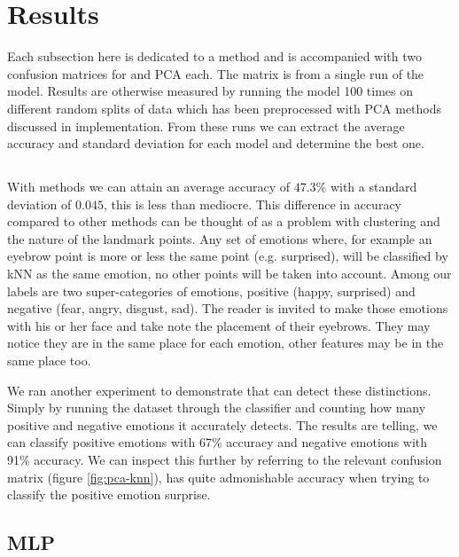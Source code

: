 \section{Results}

Each subsection here is dedicated to a method and is accompanied with two confusion matrices for \tsne and PCA each. The matrix is from a single run of the model. Results are otherwise measured by running the model 100 times on different random splits of data which has been preprocessed with PCA methods discussed in implementation. From these runs we can extract the average accuracy and standard deviation for each model and determine the best one.

\subsection{\knn}


With \knn methods we can attain an average accuracy of $47.3\%$ with a standard deviation of $0.045$, this is less than mediocre. This difference in accuracy compared to other methods can be thought of as a problem with clustering and the nature of the landmark points. Any set of emotions where, for example an eyebrow point is more or less the same point (e.g. surprised), will be classified by kNN as the same emotion, no other points will be taken into account. Among our labels are two super-categories of emotions, positive (happy, surprised) and negative (fear, angry, disgust, sad). The reader is invited to make those emotions with his or her face and take note the placement of their eyebrows. They may notice they are in the same place for each emotion, other features may be in the same place too.

We ran another experiment to demonstrate that \knn can detect these distinctions. Simply by running the dataset through the \knn classifier and counting how many positive and negative emotions it accurately detects. The results are telling, we can classify positive emotions with 67\% accuracy and negative emotions with 91\% accuracy. We can inspect this further by referring to the relevant confusion matrix (figure \ref{fig:pca-knn}), \knn has quite admonishable accuracy when trying to classify the positive emotion surprise.

\subsection{MLP}

